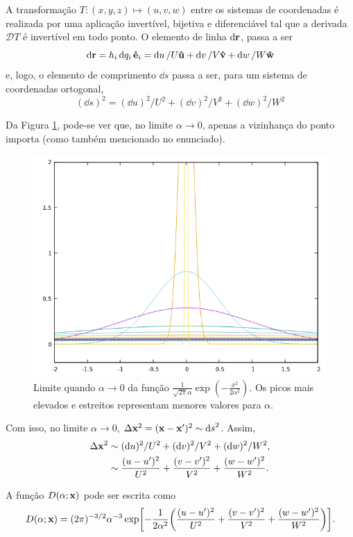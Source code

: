 A transformação  $T \colon (x,y,z) \mapsto (u,v,w)$ entre os sistemas de coordenadas é realizada por uma aplicação invertível, bijetiva e diferenciável tal que a derivada $\mathcal{D}T$ é invertível em todo ponto.
O elemento de linha $\dd{\vb{r}}$, passa a ser
\[
  \dd{\vb{r}} = h_i \dd{q_i} \vu{e}_i = \dd{u}/U \vu{u} + \dd{v}/V \vu{v} +\dd{w}/W \vu{w}
\]
e, logo, o elemento de comprimento $\dd{s}$ passa a ser, para um sistema de coordenadas ortogonal,
\[
  (\dd{s})^2 = (\dd{u})^2/U^2 + (\dd{v})^2/V^2 + (\dd{w})^2/W^2
\]

Da Figura \ref{fig:gaussian-limit}, pode-se ver que, no limite $\alpha \to 0$, apenas a vizinhança do ponto  importa (como também mencionado no enunciado).
\begin{figure}[h]
  \center
  \includegraphics[scale = .4]{./imgs/gaussian_limit.png}
  \caption{Limite quando $\alpha \to 0$ da função $\frac{1}{\sqrt{2\pi} \alpha} \exp(-\frac{x^2}{2\alpha^2})$. Os picos mais elevados e estreitos representam menores valores para $\alpha$.}
  \label{fig:gaussian-limit}
\end{figure}

Com isso, no limite $\alpha \to 0$, $\Delta \vb{x}^2 = (\vb{x} - \vb{x}^\prime)^2 \sim \dd{s}^2$. Assim,
\begin{align*}
  \Delta \vb{x}^2
  &\sim (\dd{u})^2/U^2 + (\dd{v})^2/V^2 + (\dd{w})^2/W^2,
  \\
  &\sim \frac{(u - u^\prime)^2}{U^2} + \frac{(v - v^\prime)^2}{V^2} + \frac{(w - w^\prime)^2}{W^2}.
\end{align*}

A função $D(\alpha; \vb{x})$ pode ser escrita como
\begin{equation*}
  D(\alpha; \vb{x}) = (2\pi)^{-3/2} \alpha^{-3} \exp[-\frac{1}{2\alpha^2}\qty(\frac{(u - u^\prime)^2}{U^2} + \frac{(v - v^\prime)^2}{V^2} + \frac{(w - w^\prime)^2}{W^2})].
\end{equation*}

